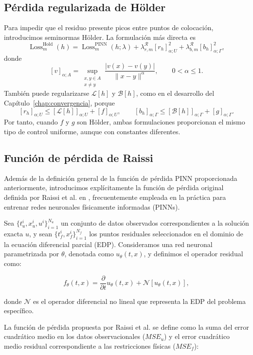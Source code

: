 \subsection{Pérdida regularizada de Hölder}

Para impedir que el residuo presente picos entre puntos de colocación, introducimos seminormas Hölder. La formulación más directa es
\[
\operatorname{Loss}^{\mathrm{Hold}}_m(h)
=
\operatorname{Loss}^{\mathrm{PINN}}_m(h;\lambda)
+
\lambda^{\mathcal R}_{r,m}[r_h]^2_{\alpha;U}
+
\lambda^{\mathcal R}_{b,m}[b_h]^2_{\alpha;\Gamma},
\]
donde
\[
[v]_{\alpha;A}
=
\sup_{\substack{x,y\in A\\x\neq y}}
\frac{|v(x)-v(y)|}{\|x-y\|^\alpha},
\qquad 0<\alpha\leq1.
\]
También puede regularizarse $\mathcal{L}[h]$ y $\mathcal{B}[h]$, como en el desarrollo del Capítulo~\ref{chap:convergencia}, porque
\[
[r_h]_{\alpha;U}
\leq
[\mathcal{L}[h]]_{\alpha;U}+[f]_{\alpha;U},
\qquad
[b_h]_{\alpha;\Gamma}
\leq
[\mathcal{B}[h]]_{\alpha;\Gamma}+[g]_{\alpha;\Gamma}.
\]
Por tanto, cuando $f$ y $g$ son Hölder, ambas formulaciones proporcionan el mismo tipo de control uniforme, aunque con constantes diferentes.

\subsection{Funci\'on de pérdida de Raissi}
\label{sec:raissi-loss}

Además de la definición general de la función de pérdida PINN proporcionada anteriormente, introducimos explícitamente la función de pérdida original definida por Raissi et al. en \cite{raissi2017physics}, frecuentemente empleada en la práctica para entrenar redes neuronales físicamente informadas (PINNs).

Sea \(\{t_u^i, x_u^i, u^i\}_{i=1}^{N_u}\) un conjunto de datos observados correspondientes a la solución exacta \(u\), y sean \(\{t_f^i, x_f^i\}_{i=1}^{N_f}\) los puntos residuales seleccionados en el dominio de la ecuación diferencial parcial (EDP). Consideramos una red neuronal parametrizada por \(\theta\), denotada como \(u_{\theta}(t, x)\), y definimos el operador residual como:

\[
f_{\theta}(t, x) = \frac{\partial}{\partial t}u_{\theta}(t,x) + \mathcal{N}[u_{\theta}(t,x)],
\]

donde \(\mathcal{N}\) es el operador diferencial no lineal que representa la EDP del problema específico.

La función de pérdida propuesta por Raissi et al. \cite{raissi2017physics} se define como la suma del error cuadrático medio en los datos observacionales (\(MSE_u\)) y el error cuadrático medio residual correspondiente a las restricciones físicas (\(MSE_f\)):

